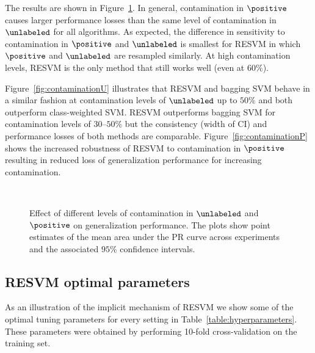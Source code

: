 The results are shown in Figure~\ref{fig:contaminationeffect}. In general, contamination in $\positive$ causes larger performance losses than the same level of contamination in $\unlabeled$ for all algorithms. As expected, the difference in sensitivity to contamination in $\positive$ and $\unlabeled$ is smallest for RESVM in which $\positive$ and $\unlabeled$ are resampled similarly. At high contamination levels, RESVM is the only method that still works well (even at $60\%$). 

Figure~\ref{fig:contaminationU} illustrates that RESVM and bagging SVM behave in a similar fashion at contamination levels of $\unlabeled$ up to $50\%$ and both outperform class-weighted SVM. RESVM outperforms bagging SVM for contamination levels of $30$--$50\%$ but the consistency (width of CI) and performance losses of both methods are comparable. Figure~\ref{fig:contaminationP} shows the increased robustness of RESVM to contamination in $\positive$ resulting in reduced loss of generalization performance for increasing contamination. 


\begin{figure}%
\centering
{}\hfill
{}\\
  \caption{Effect of different levels of contamination in $\unlabeled$ and $\positive$ on generalization performance. The plots show point estimates of the mean area under the PR curve across experiments and the associated $95\%$ confidence intervals.} 
  \label{fig:contaminationeffect}
\end{figure}



\subsection{RESVM optimal parameters}
As an illustration of the implicit mechanism of RESVM we show some of the optimal tuning parameters for every setting in Table~\ref{table:hyperparameters}. These parameters were obtained by performing 10-fold cross-validation on the training set. 

